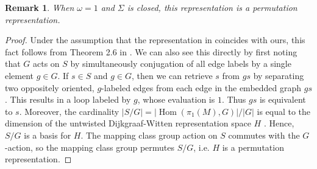 \documentclass{ws-jktr}
\newtheorem{rmk}[thm]{Remark}
\DeclareMathOperator{\Hom}{Hom}
\newcommand{\Si}{\Sigma}
\begin{document}
\begin{rmk} 
When $\omega = 1$ and $\Si$ is closed, this representation is a permutation representation.  
\end{rmk}

\begin{proof}
Under the assumption that the representation in \cite{fjfu} coincides with ours, this fact follows from Theorem 2.6 in \cite{fjfu}.  We can also see this directly by first noting that $G$ acts on $S$ by simultaneously conjugation of all edge labels by a single element $g \in G$.  If $s \in S$ and $g \in G$, then we can retrieve $s$ from $gs$ by separating two oppositely oriented, $g$-labeled edges from each edge in the embedded graph $gs$.  This results in a loop labeled by $g$, whose evaluation is $1$.  Thus $gs$ is equivalent to $s$.  Moreover, the cardinality $|S/G| = |\Hom(\pi_1(M), G)|/|G|$ is equal to the dimension of the untwisted Dijkgraaf-Witten representation space $H$ \cite{dijkgraaf1990}.  Hence, $S/G$ is a basis for $H$.  The mapping class group action on $S$ commutes with the $G$-action, so the mapping class group permutes $S/G$, i.e. $H$ is a permutation representation.
\end{proof}

\newcommand{\nc}{\newcommand}
\newcommand{\rnc}{\renewcommand}


     \nc{\lcx}{-0.5}
     \nc{\lcy}{0.866}
     \nc{\rcx}{-\lcx}
     \nc{\rcy}{\lcy}

     \nc{\makeBdy}{
       \begin{scope}[very thick,decoration={
             markings,
             mark=at position 0.5 with {\arrow{>}}}
         ]  

         \draw (-1,0) -- (\lcx, \lcy); 
         \draw (\lcx, \lcy) -- (\rcx, \rcy); 
         \draw  (1, 0) -- (\rcx, \rcy);
       \end{scope}
     }

    \nc{\lcutx}{-0.6}
    \nc{\lcuty}{0.6928}
    \nc{\lcut}{(\lcutx, \lcuty)}
    \nc{\rcutx}{-\lcutx}
    \nc{\rcuty}{\lcuty}
    \nc{\rcut}{(\rcutx, \rcuty)}

    \nc{\mvx}{0}
    \nc{\mvy}{0.2}
    \nc{\mv}{(\mvx, \mvy)}

    \nc{\outEdge}{\draw[postaction={decorate}]  (0, 0) -- \mv node[pos=.5, right]{$hgh^{-1}$};}
\end{document}
